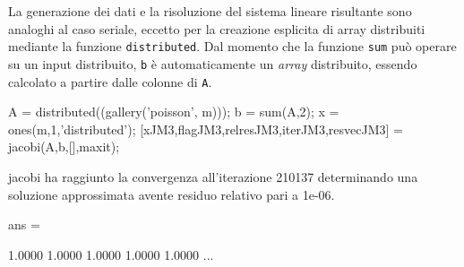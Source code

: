 La generazione dei dati e la risoluzione del sistema lineare risultante sono analoghi al caso seriale, eccetto per la creazione esplicita di array 
distribuiti mediante la funzione \lstinline{distributed}.\newline
Dal momento che la funzione \lstinline{sum} pu\`o operare su un input distribuito, \lstinline{b} \`e automaticamente un \textit{array} distribuito, essendo 
calcolato a partire dalle colonne di \lstinline{A}.
\begin{matlabcode}
A = distributed((gallery('poisson', m)));
b = sum(A,2);
x = ones(m,1,'distributed');
[xJM3,flagJM3,relresJM3,iterJM3,resvecJM3] = jacobi(A,b,[],maxit);
\end{matlabcode}
\begin{matlaboutput}
    jacobi ha raggiunto la convergenza all'iterazione 210137
    determinando una soluzione approssimata avente residuo
    relativo pari a 1e-06.

    ans =

    1.0000    1.0000    1.0000    1.0000    1.0000    ...
\end{matlaboutput}
